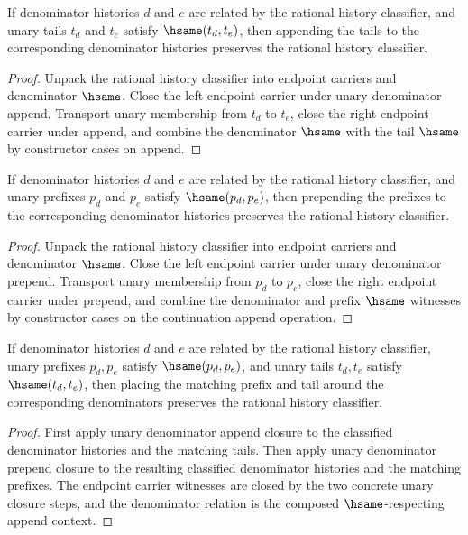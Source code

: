 \begin{theorem}
\label{thm:rat-history-classifier-append-unary-denominator-closed}
If denominator histories \(d\) and \(e\) are related by the rational history
classifier, and unary tails \(t_d\) and \(t_e\) satisfy \(\hsame(t_d,t_e)\),
then appending the tails to the corresponding denominator histories preserves
the rational history classifier.
\end{theorem}
\begin{proof}
Unpack the rational history classifier into endpoint carriers and denominator
\(\hsame\). Close the left endpoint carrier under unary denominator append.
Transport unary membership from \(t_d\) to \(t_e\), close the right endpoint
carrier under append, and combine the denominator \(\hsame\) with the tail
\(\hsame\) by constructor cases on append.
\end{proof}

\begin{theorem}
\label{thm:rat-history-classifier-prepend-unary-denominator-closed}
If denominator histories $d$ and $e$ are related by the rational history
classifier, and unary prefixes $p_d$ and $p_e$ satisfy $\hsame(p_d,p_e)$, then
prepending the prefixes to the corresponding denominator histories preserves the
rational history classifier.
\end{theorem}
\begin{proof}
Unpack the rational history classifier into endpoint carriers and denominator
$\hsame$. Close the left endpoint carrier under unary denominator prepend.
Transport unary membership from $p_d$ to $p_e$, close the right endpoint carrier
under prepend, and combine the denominator and prefix $\hsame$ witnesses by
constructor cases on the continuation append operation.
\end{proof}

\begin{theorem}
\label{thm:rat-history-classifier-unary-denominator-context-closed}
If denominator histories \(d\) and \(e\) are related by the rational history
classifier, unary prefixes \(p_d,p_e\) satisfy \(\hsame(p_d,p_e)\), and unary
tails \(t_d,t_e\) satisfy \(\hsame(t_d,t_e)\), then placing the matching prefix
and tail around the corresponding denominators preserves the rational history
classifier.
\end{theorem}
\begin{proof}
First apply unary denominator append closure to the classified denominator
histories and the matching tails. Then apply unary denominator prepend closure
to the resulting classified denominator histories and the matching prefixes.
The endpoint carrier witnesses are closed by the two concrete unary closure
steps, and the denominator relation is the composed \(\hsame\)-respecting
append context.
\end{proof}

